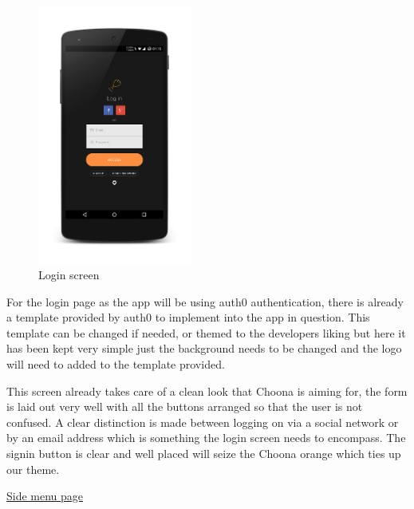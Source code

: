 \noindent
\begin{figure}[h!]
\centering
\includegraphics[width=0.45\textwidth]{./img/loginframed.png}
\caption{Login screen}
\label{fig:loginscreen}
\end{figure}

For the login page as the app will be using auth0 authentication, there is already a template provided by auth0 to implement into the app in question. This template can be changed if needed, or themed to the developers liking but here it has been kept very simple just the background needs to be changed and the logo will need to added to the template provided.

This screen already takes care of a clean look that Choona is aiming for, the form is laid out very well with all the buttons arranged so that the user is not confused. A clear distinction is made between logging on via a social network or by an email address which is something the login screen needs to encompass. The signin button is clear and well placed will seize the Choona orange which ties up our theme.\\

\clearpage

\noindent\underline{Side menu page}\newline

